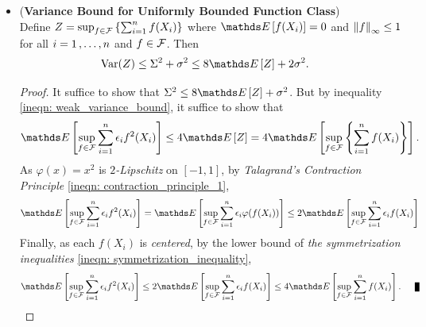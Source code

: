 \documentclass[11pt]{article}
\begin{document}
\begin{itemize}
\item \begin{theorem} (\textbf{Variance Bound for Uniformly Bounded Function Class}) \citep{boucheron2013concentration}\\
Define $Z =  \sup_{f \in {\mathcal F}}\left\{\sum_{i=1}^n f(X_i)\right\}$  where $\E{}{f(X_i)} =0$  and $\left\|f\right\|_{\infty} \le 1$ for all $i = 1 \,{,}\ldots{,}\, n$ and $f \in {\mathcal F}$. Then
\begin{align}
\text{Var}(Z) &\le \Sigma^2 + \sigma^2 \le 8 \E{}{Z} + 2\sigma^2. \label{ineqn: variance_bound_by_weak_1}
\end{align}
\end{theorem}
\begin{proof} 
It suffice to show that $\Sigma^2 \le 8 \E{}{Z} + \sigma^2$. But by inequality \eqref{ineqn: weak_variance_bound}, it suffice to show that 
\begin{align*}
 \E{}{\sup_{f \in \cF}\sum_{i=1}^{n}\epsilon_i f^2(X_i)} \le 4\E{}{Z} = 4\E{}{\sup_{f \in \cF}\set{\sum_{i=1}^n f(X_i)}}.
\end{align*} As $\varphi(x) = x^2$ is \emph{$2$-Lipschitz} on $[-1, 1]$, by \emph{Talagrand's Contraction Principle} \eqref{ineqn: contraction_principle_1}, 
\begin{align*}
 \E{}{\sup_{f \in \cF}\sum_{i=1}^{n}\epsilon_i f^2(X_i)} = \E{}{\sup_{f \in \cF}\sum_{i=1}^{n}\epsilon_i \varphi(f(X_i))}   \le 2\E{}{\sup_{f \in \cF}\sum_{i=1}^{n}\epsilon_i f(X_i)}
\end{align*} Finally, as each $f(X_i)$ is \emph{centered}, by the lower bound of \emph{the symmetrization inequalities} \eqref{ineqn: symmetrization_inequality},
\begin{align*}
 \E{}{\sup_{f \in \cF}\sum_{i=1}^{n}\epsilon_i f^2(X_i)}  \le 2\E{}{\sup_{f \in \cF}\sum_{i=1}^{n}\epsilon_i f(X_i)} \le 4\E{}{\sup_{f \in \cF}\sum_{i=1}^{n} f(X_i)}. \qed
\end{align*} 
\end{proof}
\end{itemize}
\end{document}
